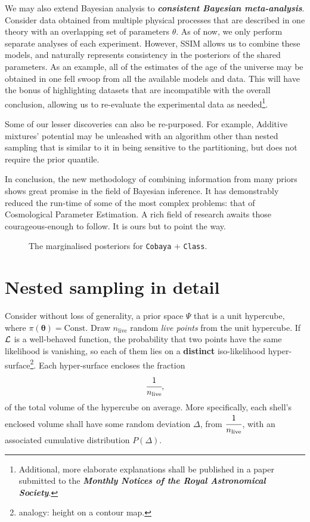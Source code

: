 \documentclass[usenatbib]{mnras}
\begin{document}
We may also extend Bayesian analysis to \textbf{\emph{consistent
    Bayesian meta-analysis}}. Consider data obtained from multiple
physical processes that are described in one theory with an
overlapping set of parameters $\theta$. As of now, we only perform
separate analyses of each experiment. However, SSIM allows us to
combine these models, and naturally represents consistency in the
posteriors of the shared parameters. As an example, all of the
estimates of the age of the universe may be obtained in one fell swoop
from all the available models and data. This will have the bonus of
highlighting datasets that are incompatible with the overall
conclusion, allowing us to re-evaluate the experimental data as
needed\footnote{Additional, more elaborate explanations shall be
  published in a paper submitted to the \textbf{\emph{Monthly Notices
      of the Royal Astronomical Society}}.}.

Some of our lesser discoveries can also be re-purposed. For example,
Additive mixtures' potential may be unleashed with an algorithm other
than nested sampling that is similar to it in being sensitive to the
partitioning, but does not require the prior quantile.

In conclusion, the new methodology of combining information from many
priors shows great promise in the field of Bayesian inference. It has
demonstrably reduced the run-time of some of the most complex
problems: that of Cosmological Parameter Estimation. A rich field of
research awaits those courageous-enough to follow. It is ours but to point
the way.




\begin{landscape}
\begin{figure}
  \centering %
  
  \caption{The marginalised posteriors for \texttt{Cobaya} +
    \texttt{Class}. }\label{fig:cosmology}
\end{figure}
\end{landscape}


\appendix

\section{Nested sampling in detail}\label{sec:ns}
Consider without loss of generality, a prior space \(\Psi\) that is a
unit hypercube, where \(\pi(\bm{\theta}) = \text{Const.}\) Draw
\(n_\text{live}\) random \emph{live points} from the unit
hypercube. If \({\cal L}\) is a well-behaved function, the probability
that two points have the same likelihood is vanishing, so each of them
lies on a \textbf{distinct} iso-likelihood
hyper-surface\footnote{analogy: height on a contour map. }. Each
hyper-surface encloses the fraction
\begin{equation}
\cfrac{1}{n_\text{live}},
\end{equation}
of the total volume of the hypercube on average. More specifically,
each shell's enclosed volume shall have some random deviation \(\Delta\), from
\(\cfrac{1}{n_\text{live}}\), with an associated cumulative
distribution \(P(\Delta)\).
\end{document}

